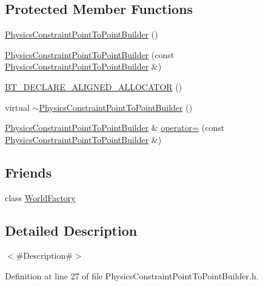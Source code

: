 \subsection*{Protected Member Functions}
\begin{DoxyCompactItemize}
\item 
\mbox{\hyperlink{classnjli_1_1_physics_constraint_point_to_point_builder_a636b1167ea436b1dd497e0072a60a81d}{Physics\+Constraint\+Point\+To\+Point\+Builder}} ()
\item 
\mbox{\hyperlink{classnjli_1_1_physics_constraint_point_to_point_builder_a8eff4e6df18c657ef2ff1d4d28b4631d}{Physics\+Constraint\+Point\+To\+Point\+Builder}} (const \mbox{\hyperlink{classnjli_1_1_physics_constraint_point_to_point_builder}{Physics\+Constraint\+Point\+To\+Point\+Builder}} \&)
\item 
\mbox{\hyperlink{classnjli_1_1_physics_constraint_point_to_point_builder_a684ae02356a40345b8ac6c981ffdae7e}{B\+T\+\_\+\+D\+E\+C\+L\+A\+R\+E\+\_\+\+A\+L\+I\+G\+N\+E\+D\+\_\+\+A\+L\+L\+O\+C\+A\+T\+OR}} ()
\item 
virtual \mbox{\hyperlink{classnjli_1_1_physics_constraint_point_to_point_builder_a48ee05e7ce2a4e2674322b2192c02c95}{$\sim$\+Physics\+Constraint\+Point\+To\+Point\+Builder}} ()
\item 
\mbox{\hyperlink{classnjli_1_1_physics_constraint_point_to_point_builder}{Physics\+Constraint\+Point\+To\+Point\+Builder}} \& \mbox{\hyperlink{classnjli_1_1_physics_constraint_point_to_point_builder_adb8c14236faefa5f707beaba959fc887}{operator=}} (const \mbox{\hyperlink{classnjli_1_1_physics_constraint_point_to_point_builder}{Physics\+Constraint\+Point\+To\+Point\+Builder}} \&)
\end{DoxyCompactItemize}
\subsection*{Friends}
\begin{DoxyCompactItemize}
\item 
class \mbox{\hyperlink{classnjli_1_1_physics_constraint_point_to_point_builder_acb96ebb09abe8f2a37a915a842babfac}{World\+Factory}}
\end{DoxyCompactItemize}


\subsection{Detailed Description}
$<$\#\+Description\#$>$ 

Definition at line 27 of file Physics\+Constraint\+Point\+To\+Point\+Builder.\+h.



